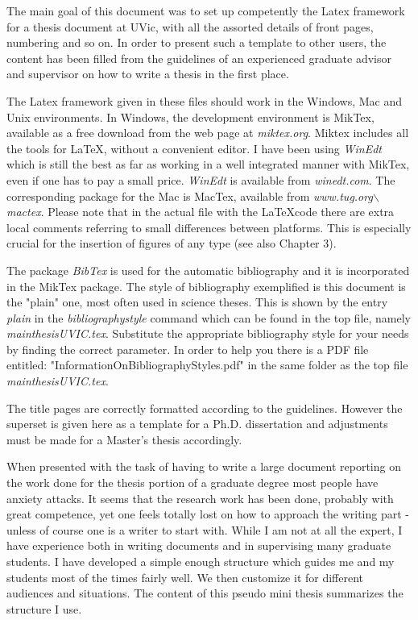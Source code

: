 \label{chapter:introduction}

The main goal of this document was to set up competently the Latex framework for a thesis document at UVic, with all the assorted details of front pages, numbering and so on. In order to present such a template to other users, the content has been filled from the guidelines of an experienced graduate advisor and supervisor on how to write a thesis in the first place.

The Latex framework given in these files should work in the Windows, Mac and Unix environments. In Windows, the development environment is MikTex, available as a free download from the web page at \textit{miktex.org}. Miktex includes all the tools for \LaTeX, without a convenient editor. I have been using
\textit{WinEdt} which is still the best as far as working in a well integrated manner with MikTex, even if one has to pay a small price. \textit{WinEdt} is available from \textit{winedt.com}. The corresponding package for the Mac is MacTex, available from \textit{www.tug.org$\backslash$mactex}.
Please note that in the actual file with the \LaTeX code there are extra local comments referring to small differences between platforms. This is especially crucial for the insertion of figures of any type (see also Chapter 3).

The package \textit{BibTex} is used for the automatic bibliography and it is incorporated in the MikTex package. The style of bibliography exemplified is this document is the "plain" one,
most often used in science theses. This is shown
by the entry \textit{plain} in the \textit{bibliographystyle}
command which can be found in the top file, namely
\textit{mainthesisUVIC.tex}. Substitute the
appropriate bibliography style for your needs by finding
the correct parameter. In order to help you there is a PDF
file entitled: "InformationOnBibliographyStyles.pdf" in the
same folder as the top file \textit{mainthesisUVIC.tex}.

The title pages are correctly formatted according to the guidelines. However the superset is given here as a template for a Ph.D. dissertation and adjustments must be made for a Master's thesis accordingly.

When presented with the task of having to write a large document reporting on the work done for the thesis portion of a graduate degree most people have anxiety attacks. It seems that the research work has been done, probably with great competence, yet one feels totally lost on how to approach the writing part - unless of course one is a writer to start with. While I am not at all the expert, I have experience both in writing documents and in supervising many graduate students. I have developed a simple enough structure which guides me and my students most of the times fairly well. We then customize it for different audiences and situations. The content of this pseudo mini thesis summarizes the structure I use.

